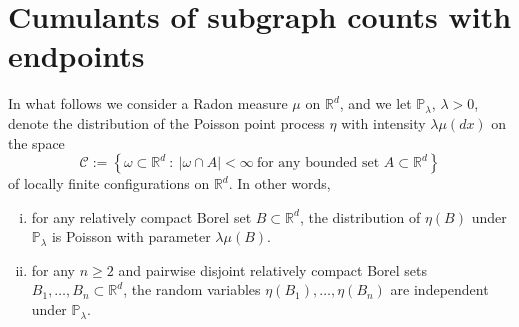 \documentclass[12pt]{article}
\newcommand{\R}{\mathbb{R}}
\newcommand{\IP}{\mathbb{P}}
\def\real{{\mathord{\mathbb R}}}
\numberwithin{equation}{section}
\begin{document}
\section{Cumulants of subgraph counts with endpoints} 
\label{rcm}
\noindent
In what follows we consider 
 a Radon measure $\mu$ on $\real^d$, and we let 
$\IP_\lambda$, $\lambda > 0$, 
 denote the distribution of the Poisson point process $\eta$ 
 with intensity $\lambda \mu (dx)$ on the space 
 $$\mathcal{C}:=\left\{\omega\subset\R^d \ : \ |\omega\cap A|<\infty ~\text{for any bounded set $A\subset\R^d$}\right\}  
 $$
 of locally finite configurations on $\R^d$. 
 In other words, 
 \begin{enumerate}[i)] 
 \item for any relatively compact Borel set $B\subset \R^d$, the distribution of $\eta(B)$ under $\IP_\lambda$ is Poisson with parameter $\lambda \mu (B)$.
   \vspace{-0.2cm}  
 \item for any $n\geq 2$ and pairwise disjoint
   relatively compact Borel sets $B_1, \ldots ,B_n\subset\R^d$, the random variables $\eta(B_1), \ldots ,\eta(B_n)$ are independent under $\IP_\lambda$.
\end{enumerate}
\end{document}
